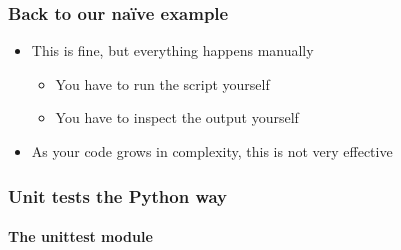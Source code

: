 \documentclass[9pt]{beamer}
\begin{document}
\begin{frame}
  \frametitle{Back to our na\"ive example}
  

  \medskip
  
  \begin{itemize}    
  \item This is fine, but everything happens manually
    \begin{itemize}
    \item You have to run the script yourself
    \item You have to inspect the output yourself
    \end{itemize}
  \item As your code grows in complexity, this is not very effective
  \end{itemize}
\end{frame}


\begin{frame}
  \frametitle{Unit tests the Python way}
  \framesubtitle{The unittest module}
  
\end{frame}
\end{document}
